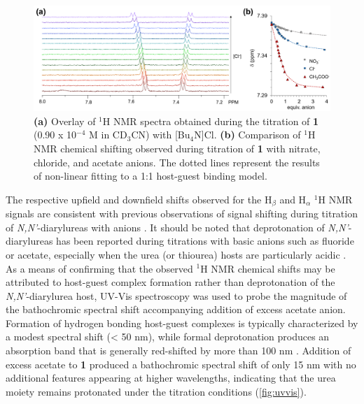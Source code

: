\begin{figure}[h!]
    \centering
    \includegraphics[width=0.8\linewidth]{figures/pub2/HNMR.png}
    \caption{\textbf{(a)} Overlay of $^{1}$H NMR spectra obtained during the titration of \textbf{1} (0.90 x 10$^{-4}$ M in CD$_{3}$CN) with [Bu$_{4}$N]Cl. \textbf{(b)} Comparison of $^{1}$H NMR chemical shifting observed during titration of  \textbf{1} with nitrate, chloride, and acetate anions. The dotted lines represent the results of non-linear fitting to a 1:1 host-guest binding model.}\label{HNMR}
\end{figure}

The respective upfield and downfield shifts observed for the H$_{\beta}$ and H$_{\alpha}$ $^{1}$H NMR signals are consistent with previous observations of signal shifting during titration of \textit{N,N'}-diarylureas with anions \citep{Boiocchi2004, Smith1992, Regueiro-Figueroa2010, Clare2009}. It should be noted that deprotonation of \textit{N,N'}-diarylureas has been reported during titrations with basic anions such as fluoride or acetate, especially when the urea (or thiourea) hosts are particularly acidic \citep{Amendola2010, Carreira-Barral2017}. As a means of confirming that the observed $^{1}$H NMR chemical shifts may be attributed to host-guest complex formation rather than deprotonation of the \textit{N,N'}-diarylurea host, UV-Vis spectroscopy was used to probe the magnitude of the bathochromic spectral shift accompanying addition of excess acetate anion. Formation of hydrogen bonding host-guest complexes is typically characterized by a modest spectral shift (< 50 nm), while formal deprotonation produces an absorption band that is generally red-shifted by more than 100 nm \citep{Boiocchi2004, Esteban-Gomez2005, Gomez2005}. Addition of excess acetate to  \textbf{1} produced a bathochromic spectral shift of only 15 nm with no additional features appearing at higher wavelengths, indicating that the urea moiety remains protonated under the titration conditions (\autoref{fig:uvvis}).     

